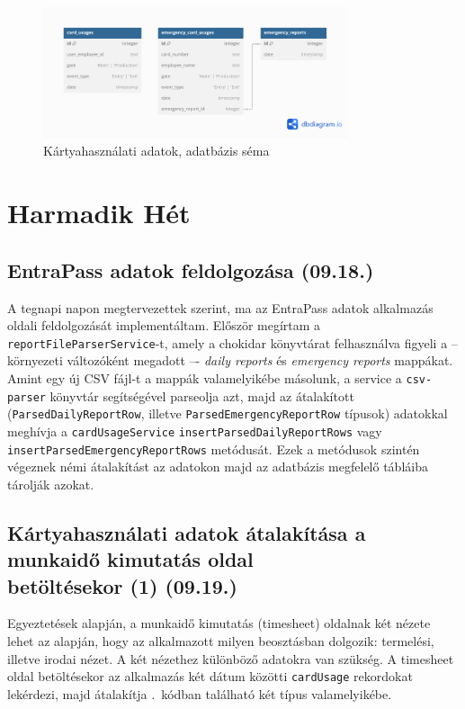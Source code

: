 \documentclass[a4paper]{article}
\newcommand{\inlts}[1]{\texttt{#1}}
\newcommand{\inltxt}[1]{\texttt{#1}}
\begin{document}
\begin{figure}[ht]
  \centering
  \includegraphics[clip, trim=0 50 0 0, width = 0.8\textwidth]{images/card_usages_schema.png}
  \caption{Kártyahasználati adatok, adatbázis séma}
  \label{fig:card_usages_schema}
\end{figure}


\section{Harmadik Hét}

\subsection{EntraPass adatok feldolgozása (09.18.)}

A tegnapi napon megtervezettek szerint, ma az EntraPass adatok alkalmazás oldali feldolgozását
implementáltam. Először megírtam a \inlts{reportFileParserService}-t, amely a chokidar könyvtárat
felhasználva figyeli a -- környezeti változóként megadott –- \emph{daily reports} és \emph{emergency reports}
mappákat. Amint egy új CSV fájl-t a mappák valamelyikébe másolunk, a service a \inltxt{csv-parser}
könyvtár segítségével parseolja azt, majd az átalakított (\inlts{ParsedDailyReportRow}, illetve
\inlts{ParsedEmergencyReportRow} típusok) adatokkal meghívja a \inlts{cardUsageService}
\inlts{insertParsedDailyReportRows} vagy \inlts{insertParsedEmergencyReportRows} metódusát. Ezek
a metódusok szintén végeznek némi átalakítást az adatokon majd az adatbázis megfelelő tábláiba
tárolják azokat.

\subsection{Kártyahasználati adatok átalakítása a munkaidő kimutatás oldal\\ betöltésekor (1) (09.19.)}

Egyeztetések alapján, a munkaidő kimutatás (timesheet) oldalnak két nézete lehet az alapján, hogy az
alkalmazott milyen beosztásban dolgozik: termelési, illetve irodai nézet. A két nézethez különböző
adatokra van szükség. A timesheet oldal betöltésekor az alkalmazás két dátum közötti \inlts{cardUsage}
rekordokat lekérdezi, majd átalakítja .~kódban található két típus valamelyikébe.
\end{document}
